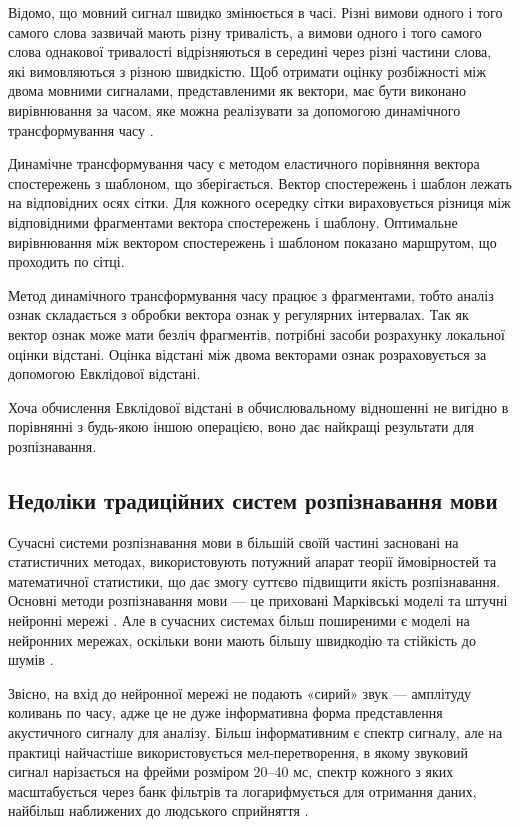 Відомо, що мовний сигнал швидко змінюється в часі. Різні вимови одного і того самого слова зазвичай мають різну тривалість, а вимови одного і того самого слова однакової тривалості відрізняються в середині через різні частини слова, які вимовляються з різною швидкістю. Щоб отримати оцінку розбіжності між двома мовними сигналами, представленими як вектори, має бути виконано вирівнювання за часом, яке можна реалізувати за допомогою динамічного трансформування часу \cite{Goldenstein_2013}.

Динамічне трансформування часу є методом еластичного порівняння вектора спостережень з шаблоном, що зберігається. Вектор спостережень і шаблон лежать на відповідних осях сітки. Для кожного осередку сітки вираховується різниця між відповідними фрагментами вектора спостережень і шаблону. Оптимальне вирівнювання між вектором спостережень і шаблоном показано маршрутом, що проходить по сітці.

Метод динамічного трансформування часу працює з фрагментами, тобто аналіз ознак складається з обробки вектора ознак у регулярних інтервалах. Так як вектор ознак може мати безліч фрагментів, потрібні засоби розрахунку локальної оцінки відстані. Оцінка відстані між двома векторами ознак розраховується за допомогою Евклідової відстані.

Хоча обчислення Евклідової відстані в обчислювальному відношенні не вигідно в порівнянні з будь-якою іншою операцією, воно дає найкращі результати для розпізнавання.

\subsection{Недоліки традиційних систем розпізнавання мови}
Сучасні системи розпізнавання мови в більшій своїй частині засновані на статистичних методах, використовують потужний апарат теорії ймовірностей та математичної статистики, що дає змогу суттєво підвищити якість розпізнавання. Основні методи розпізнавання мови --- це приховані Марківські моделі та штучні нейронні мережі \cite{Makovkin_2006, Gefke_2012}. Але в сучасних системах більш поширеними є моделі на нейронних мережах, оскільки вони мають більшу швидкодію та стійкість до шумів \cite{Hinton_2012}.

Звісно, на вхід до нейронної мережі не подають «сирий» звук — амплітуду коливань по часу, адже це не дуже інформативна форма представлення акустичного сигналу для аналізу. Більш інформативним є спектр сигналу, але на практиці найчастіше використовується мел-перетворення, в якому звуковий сигнал нарізається на фрейми розміром 20–40 мс, спектр кожного з яких масштабується через банк фільтрів та логарифмується для отримання даних, найбільш наближених до людського сприйняття \cite{Saini_2013}.


